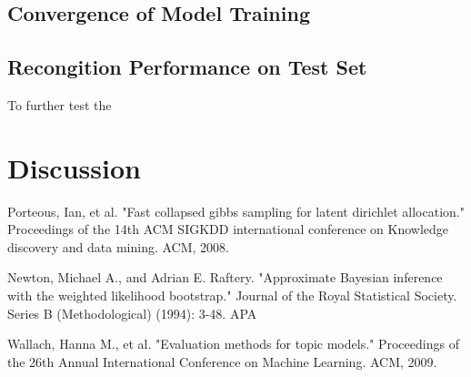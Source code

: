 \documentclass[twoside,12pt]{article}
\begin{document}
\subsection{Convergence of Model Training}


\subsection{Recongition Performance on Test Set}
To further test the 

\section{Discussion}



\begin{thebibliography}{9}
Porteous, Ian, et al. "Fast collapsed gibbs sampling for latent dirichlet allocation." Proceedings of the 14th ACM SIGKDD international conference on Knowledge discovery and data mining. ACM, 2008.


Newton, Michael A., and Adrian E. Raftery. "Approximate Bayesian inference with the weighted likelihood bootstrap." Journal of the Royal Statistical Society. Series B (Methodological) (1994): 3-48.
APA	

Wallach, Hanna M., et al. "Evaluation methods for topic models." Proceedings of the 26th Annual International Conference on Machine Learning. ACM, 2009.

\end{thebibliography}
\end{document}
